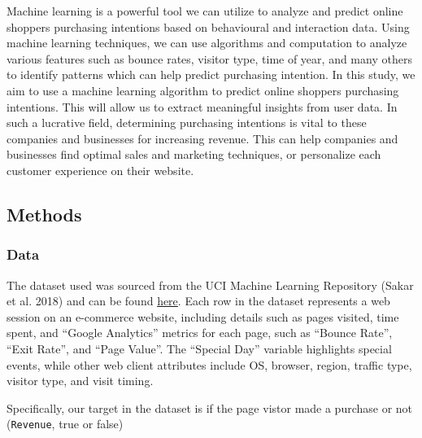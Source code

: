 \documentclass[
  letterpaper,
  DIV=11,
  numbers=noendperiod]{scrartcl}
\begin{document}
Machine learning is a powerful tool we can utilize to analyze and
predict online shoppers purchasing intentions based on behavioural and
interaction data. Using machine learning techniques, we can use
algorithms and computation to analyze various features such as bounce
rates, visitor type, time of year, and many others to identify patterns
which can help predict purchasing intention. In this study, we aim to
use a machine learning algorithm to predict online shoppers purchasing
intentions. This will allow us to extract meaningful insights from user
data. In such a lucrative field, determining purchasing intentions is
vital to these companies and businesses for increasing revenue. This can
help companies and businesses find optimal sales and marketing
techniques, or personalize each customer experience on their website.

\subsection{Methods}\label{methods}

\subsubsection{Data}\label{data}

The dataset used was sourced from the UCI Machine Learning Repository
(Sakar et al. 2018) and can be found
\href{https://archive.ics.uci.edu/ml/datasets/Online+Shoppers+Purchasing+Intention+Dataset}{here}.
Each row in the dataset represents a web session on an e-commerce
website, including details such as pages visited, time spent, and
``Google Analytics'' metrics for each page, such as ``Bounce Rate'',
``Exit Rate'', and ``Page Value''. The ``Special Day'' variable
highlights special events, while other web client attributes include OS,
browser, region, traffic type, visitor type, and visit timing.

Specifically, our target in the dataset is if the page vistor made a
purchase or not (\texttt{Revenue}, true or false)
\end{document}
